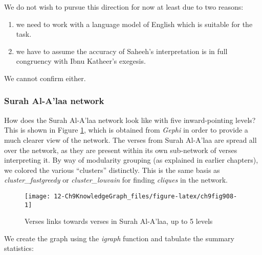 \documentclass[
]{article}
\providecommand{\tightlist}{%
  \setlength{\itemsep}{0pt}\setlength{\parskip}{0pt}}
\begin{document}
We do not wish to pursue this direction for now at least due to two reasons:

\begin{enumerate}
\def\labelenumi{\alph{enumi})}
\tightlist
\item
  we need to work with a language model of English which is suitable for the task.
\item
  we have to assume the accuracy of Saheeh's interpretation is in full congruency with Ibnu Katheer's exegesis.
\end{enumerate}

We cannot confirm either.

\hypertarget{surah-al-alaa-network}{%
\subsubsection{Surah Al-A'laa network}\label{surah-al-alaa-network}}

How does the Surah Al-A'laa network look like with five inward-pointing levels? This is shown in Figure \ref{fig:ch9fig908}, which is obtained from \emph{Gephi} in order to provide a much clearer view of the network. The verses from Surah Al-A'laa are spread all over the network, as they are present within its own sub-network of verses interpreting it. By way of modularity grouping (as explained in earlier chapters), we colored the various ``clusters'' distinctly. This is the same basis as \emph{cluster\_fastgreedy} or \emph{cluster\_louvain} for finding \emph{cliques} in the network.

\begin{figure}

{\centering \texttt{[image: 12-Ch9KnowledgeGraph\_files/figure-latex/ch9fig908-1]} 

}

\caption{Verses links towards verses in Surah Al-A'laa, up to 5 levels}\label{fig:ch9fig908}
\end{figure}

We create the graph using the \emph{igraph} function and tabulate the summary statistics:

\footnotesize
\end{document}
